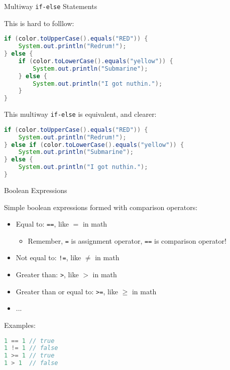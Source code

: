 \documentclass{beamer}
\begin{document}
\begin{frame}[fragile]{Multiway {\tt if-else} Statements}


This is hard to folllow:
\begin{lstlisting}[language=Java]
if (color.toUpperCase().equals("RED")) {
    System.out.println("Redrum!");
} else {
    if (color.toLowerCase().equals("yellow")) {
        System.out.println("Submarine");
    } else {
        System.out.println("I got nuthin.");
    }
}
\end{lstlisting}
\vspace{-.05in}
This multiway {\tt if-else} is equivalent, and clearer:
\vspace{-.05in}
\begin{lstlisting}[language=Java]
if (color.toUpperCase().equals("RED")) {
    System.out.println("Redrum!");
} else if (color.toLowerCase().equals("yellow")) {
    System.out.println("Submarine");
} else {
    System.out.println("I got nuthin.");
}
\end{lstlisting}

\end{frame}

\begin{frame}[fragile]{Boolean Expressions}


Simple boolean expressions formed with comparison operators:
\begin{itemize}
\item Equal to: {\tt ==}, like $=$ in math
  \begin{itemize}
    \item Remember, {\tt =} is assignment operator, {\tt ==} is comparison operator!
  \end{itemize}
\item Not equal to: {\tt !=}, like $\ne$ in math
\item Greater than: {\tt >}, like $>$ in math
\item Greater than or equal to: {\tt >=}, like $\ge$ in math
\item ...
\end{itemize}
Examples:
\begin{lstlisting}[language=Java]
1 == 1 // true
1 != 1 // false
1 >= 1 // true
1 > 1  // false
\end{lstlisting}

\end{frame}
\end{document}
